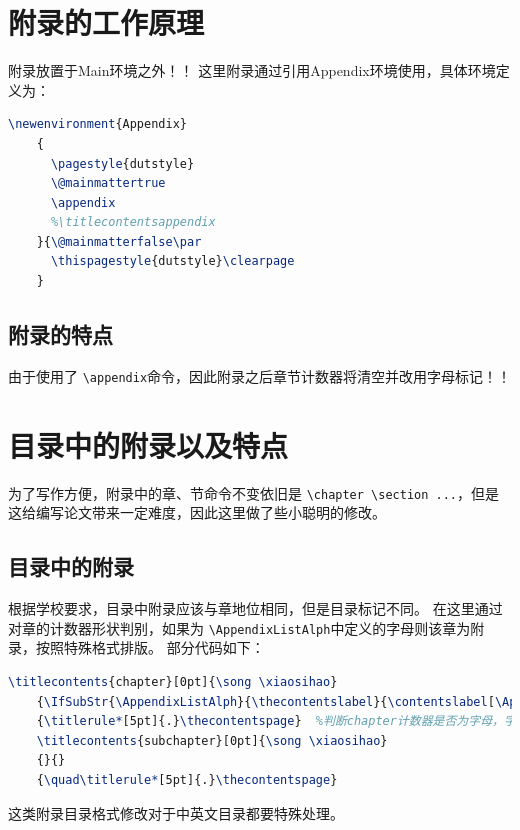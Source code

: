 \documentclass[doctor]{dutthesis} %
\begin{document}
\begin{Main} %





\end{Main} %
\begin{Appendix}
    \chapter{附录的工作原理}
    附录放置于Main环境之外！！
    这里附录通过引用Appendix环境使用，具体环境定义为：
    \begin{lstlisting}[language=TeX]
	\newenvironment{Appendix}
	{
	  \pagestyle{dutstyle}
	  \@mainmattertrue
	  \appendix
	  %\titlecontentsappendix
	}{\@mainmatterfalse\par
	  \thispagestyle{dutstyle}\clearpage
	}
    \end{lstlisting}


    \section{附录的特点}
    由于使用了 \lstinline|\appendix|命令，因此附录之后章节计数器将清空并改用字母标记！！ 
    \chapter{目录中的附录以及特点}
    为了写作方便，附录中的章、节命令不变依旧是 \lstinline|\chapter \section ...|，但是这给编写论文带来一定难度，因此这里做了些小聪明的修改。
    \section{目录中的附录}
    根据学校要求，目录中附录应该与章地位相同，但是目录标记不同。
    在这里通过对章的计数器形状判别，如果为 \lstinline|\AppendixListAlph|中定义的字母则该章为附录，按照特殊格式排版。 
    部分代码如下：
    \begin{lstlisting}[language=TeX]
	\titlecontents{chapter}[0pt]{\song \xiaosihao}
	{\IfSubStr{\AppendixListAlph}{\thecontentslabel}{\contentslabel[\AppendixTOCName~\thecontentslabel]{0mm}\phantom{\AppendixTOCName~\thecontentslabel}\quad}{\thecontentslabel\quad}}{}
	{\titlerule*[5pt]{.}\thecontentspage}  %判断chapter计数器是否为字母，字母则为附录
	\titlecontents{subchapter}[0pt]{\song \xiaosihao}
	{}{}
	{\quad\titlerule*[5pt]{.}\thecontentspage}
    \end{lstlisting}
    这类附录目录格式修改对于中英文目录都要特殊处理。


\end{Appendix}
\end{document}
